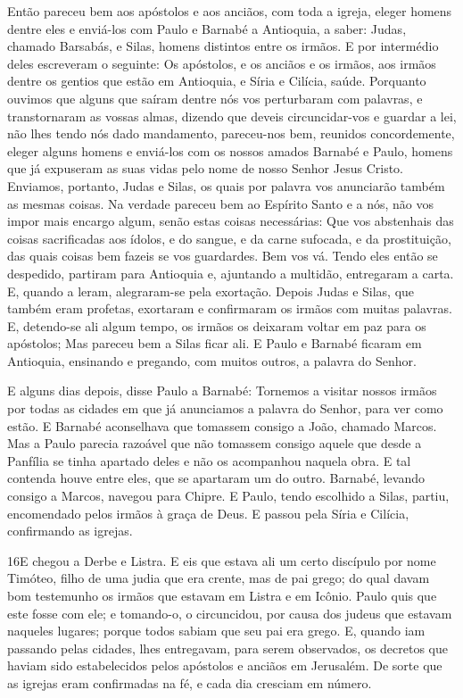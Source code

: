 Então pareceu bem aos apóstolos e aos anciãos, com toda a igreja,
eleger homens dentre eles e enviá-los com Paulo e Barnabé a
Antioquia, a saber: Judas, chamado Barsabás, e Silas, homens
distintos entre os irmãos. E por intermédio deles escreveram
o seguinte: Os apóstolos, e os anciãos e os irmãos, aos irmãos
dentre os gentios que estão em Antioquia, e Síria e Cilícia, saúde.
Porquanto ouvimos que alguns que saíram dentre nós vos
perturbaram com palavras, e transtornaram as vossas almas, dizendo
que deveis circuncidar-vos e guardar a lei, não lhes tendo nós dado
mandamento, pareceu-nos bem, reunidos concordemente, eleger
alguns homens e enviá-los com os nossos amados Barnabé e Paulo,
homens que já expuseram as suas vidas pelo nome de nosso
Senhor Jesus Cristo. Enviamos, portanto, Judas e Silas, os
quais por palavra vos anunciarão também as mesmas coisas. Na
verdade pareceu bem ao Espírito Santo e a nós, não vos impor mais
encargo algum, senão estas coisas necessárias: Que vos
abstenhais das coisas sacrificadas aos ídolos, e do sangue, e da
carne sufocada, e da prostituição, das quais coisas bem fazeis se
vos guardardes. Bem vos vá. Tendo eles então se despedido,
partiram para Antioquia e, ajuntando a multidão, entregaram a carta.
E, quando a leram, alegraram-se pela exortação. Depois
Judas e Silas, que também eram profetas, exortaram e confirmaram os
irmãos com muitas palavras. E, detendo-se ali algum tempo, os
irmãos os deixaram voltar em paz para os apóstolos; Mas
pareceu bem a Silas ficar ali. E Paulo e Barnabé ficaram em
Antioquia, ensinando e pregando, com muitos outros, a palavra do
Senhor.

E alguns dias depois, disse Paulo a Barnabé: Tornemos a visitar
nossos irmãos por todas as cidades em que já anunciamos a palavra do
Senhor, para ver como estão. E Barnabé aconselhava que
tomassem consigo a João, chamado Marcos. Mas a Paulo parecia
razoável que não tomassem consigo aquele que desde a Panfília se
tinha apartado deles e não os acompanhou naquela obra. E tal
contenda houve entre eles, que se apartaram um do outro. Barnabé,
levando consigo a Marcos, navegou para Chipre. E Paulo, tendo
escolhido a Silas, partiu, encomendado pelos irmãos à graça de Deus.
E passou pela Síria e Cilícia, confirmando as igrejas.

\medskip

\lettrine{16} E chegou a Derbe e Listra. E eis que estava ali
um certo discípulo por nome Timóteo, filho de uma judia que era
crente, mas de pai grego; do qual davam bom testemunho os irmãos
que estavam em Listra e em Icônio. Paulo quis que este fosse com
ele; e tomando-o, o circuncidou, por causa dos judeus que estavam
naqueles lugares; porque todos sabiam que seu pai era grego. E,
quando iam passando pelas cidades, lhes entregavam, para serem
observados, os decretos que haviam sido estabelecidos pelos
apóstolos e anciãos em Jerusalém. De sorte que as igrejas eram
confirmadas na fé, e cada dia cresciam em número.


